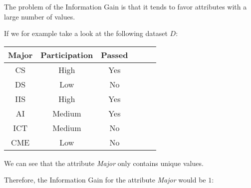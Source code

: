 \documentclass[
english,
smallborders
]{i6prcsht}
\begin{document}
\begin{solution}
	The problem of the Information Gain is that it tends to favor attributes with a large number of values.
	
	If we for example take a look at the following dataset $D$:
	
	\begin{center}
		\begin{tabular}{|c|c|c|c|c|c|}
			\hline
			\textbf{Major} & \textbf{Participation} & \textbf{Passed} \\ \hline
			CS             & High                   & Yes             \\ \hline
			DS             & Low                    & No              \\ \hline
			IIS            & High                   & Yes             \\ \hline
			AI             & Medium                 & Yes             \\ \hline
			ICT            & Medium                 & No              \\ \hline
			CME            & Low                    & No              \\ \hline
		\end{tabular}
	\end{center}
	
	We can see that the attribute \textit{Major} only contains unique values.
	
	Therefore, the Information Gain for the attribute \textit{Major} would be $1$:
	

\end{solution}
\end{document}
